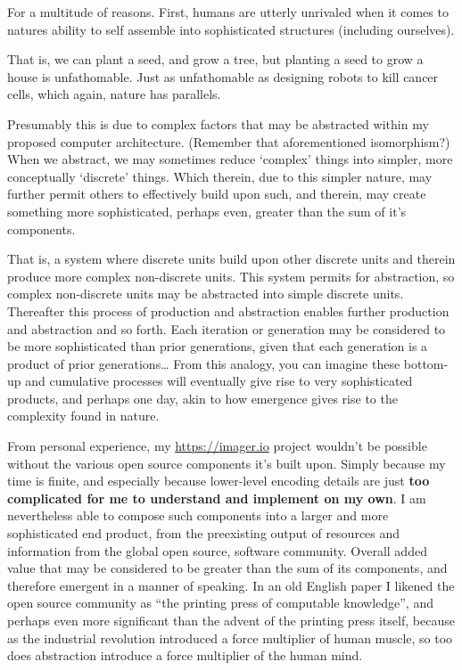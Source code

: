 For a multitude of reasons. First, humans are utterly unrivaled when it comes to natures ability to self assemble into sophisticated structures (including ourselves).

That is, we can plant a seed, and grow a tree, but planting a seed to grow a house is unfathomable. Just as unfathomable as designing robots to kill cancer cells, which again, nature has parallels. 

Presumably this is due to complex factors that may be abstracted within my proposed computer architecture. (Remember that aforementioned isomorphism?) When we abstract, we may sometimes reduce `complex' things into simpler, more conceptually `discrete' things. Which therein, due to this simpler nature, may further permit others to effectively build upon such, and therein, may create something more sophisticated, perhaps even, greater than the sum of it's components. 

That is, a system where discrete units build upon other discrete units and therein produce more complex non-discrete units. This system permits for abstraction, so complex non-discrete units may be abstracted into simple discrete units. Thereafter this process of production and abstraction enables further production and abstraction and so forth. Each iteration or generation may be considered to be more sophisticated than prior generations, given that each generation is a product of prior generations… From this analogy, you can imagine these bottom-up and cumulative processes will eventually give rise to very sophisticated products, and perhaps one day, akin to how emergence gives rise to the complexity found in nature.

From personal experience, my \url{https://imager.io} project wouldn’t be possible without the various open source components it’s built upon. Simply because my time is finite, and especially because lower-level encoding details are just \textbf{too complicated for me to understand and implement on my own}. I am nevertheless able to compose such components into a larger and more sophisticated end product, from the preexisting output of resources and information from the global open source, software community. Overall added value that may be considered to be greater than the sum of its components, and therefore emergent in a manner of speaking. In an old English paper I likened the open source community as ``the printing press of computable knowledge'', and perhaps even more significant than the advent of the printing press itself, because as the industrial revolution introduced a force multiplier of human muscle, so too does abstraction introduce a force multiplier of the human mind.

